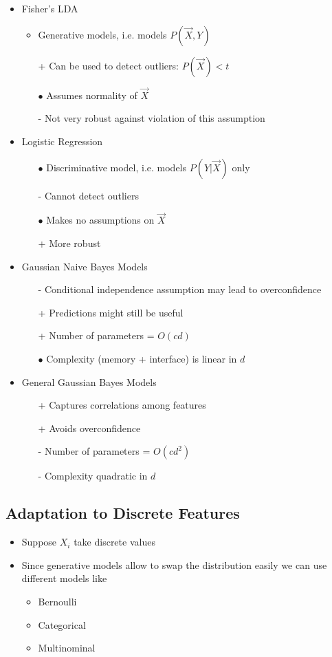 \documentclass[8pt,a4paper]{scrartcl}
\begin{document}
\begin{multicols*}{3}
\begin{itemize}
\ncompaq
\item Fisher's LDA
\begin{itemize}
\ncompaq
\item Generative models, i.e. models $P(\vec{X},Y)$
\item[+] Can be used to detect outliers: $P(\vec{X})<t$
\item[$\bullet$] Assumes normality of $\vec{X}$
\item[-] Not very robust against violation of this assumption
\end{itemize}
\item Logistic Regression
\begin{itemize}
\ncompaq
\item[$\bullet$] Discriminative model, i.e. models $P(Y|\vec{X})$ only
\item[-] Cannot detect outliers
\item[$\bullet$] Makes no assumptions on $\vec{X}$
\item[+] More robust
\end{itemize}
\item Gaussian Naive Bayes Models
\begin{itemize}
\ncompaq
\item[-] Conditional independence assumption may lead to overconfidence 
\item[+] Predictions might still be useful
\item[+] Number of parameters = $O(c d)$
\item[$\bullet$] Complexity (memory + interface) is linear in $d$
\end{itemize}
\item General Gaussian Bayes Models
\begin{itemize}
\ncompaq
\item[+] Captures correlations among features
\item[+] Avoids overconfidence
\item[-] Number of parameters = $O(c d^2)$
\item[-] Complexity quadratic in $d$
\end{itemize}
\end{itemize}

\subsection{Adaptation to Discrete Features}

\begin{itemize}
\ncompaq
\item Suppose $X_i$ take discrete values
\item Since generative models allow to swap the distribution easily we can use different models like
\begin{itemize}
\ncompaq
\item Bernoulli
\item Categorical
\item Multinominal
\end{itemize}
\end{itemize}


\end{multicols*}
\end{document}
